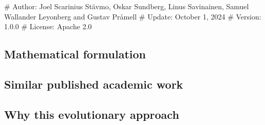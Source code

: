 # Author: Joel Scarinius Stävmo, Oskar Sundberg, Linus Savinainen, Samuel Wallander Leyonberg  and Gustav Pråmell
# Update: October 1, 2024
# Version: 1.0.0
# License: Apache 2.0

\subsection{Mathematical formulation}
\subsection{Similar published academic work}


\subsection{Why this evolutionary approach}
